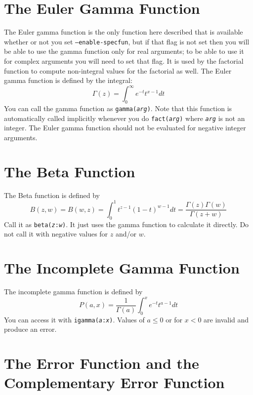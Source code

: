 \documentclass{article}
\begin{document}
\section*{The Euler Gamma Function}

The Euler gamma function is the only function here described that is
available whether or not you set \texttt{--enable-specfun}, but if
that flag is not set then you will be able to use the gamma function
only for real arguments; to be able to use it for complex arguments
you will need to set that flag.  It is used by the factorial function
to compute non-integral values for the factorial as well.  The Euler
gamma function is defined by the integral:
\begin{equation}
\Gamma(z) = \int^\infty_0 e^{-t}t^{x-1} dt
\end{equation}
You can call the gamma function as \texttt{gamma(\textsl{arg})}.  Note
that this function is automatically called implicitly whenever you do
\texttt{fact(\textsl{arg})} where \texttt{\textsl{arg}} is not an
integer.  The Euler gamma function should not be evaluated for
negative integer arguments.

\section*{The Beta Function}

The Beta function is defined by
\begin{equation}
\label{betafunc}
B(z,w) = B(w,z) = \int^1_0 t^{z-1}(1-t)^{w-1} dt = \frac{\Gamma(z)\Gamma(w)}{\Gamma(z + w)}
\end{equation}
Call it as \texttt{beta(\textsl{z}:\textsl{w})}.  It just uses the
gamma function to calculate it directly.  Do not call it with negative
values for $z$ and/or $w$.

\section*{The Incomplete Gamma Function}

The incomplete gamma function is defined by
\begin{equation}
P(a,x) = \frac{1}{\Gamma(a)}\int^x_0 e^{-t}t^{a-1} dt
\end{equation}
You can access it with \texttt{igamma(\textsl{a}:\textsl{x})}.  Values
of $a \le 0$ or for $x < 0$ are invalid and produce an error.

\section*{The Error Function and the Complementary Error Function}
\end{document}
